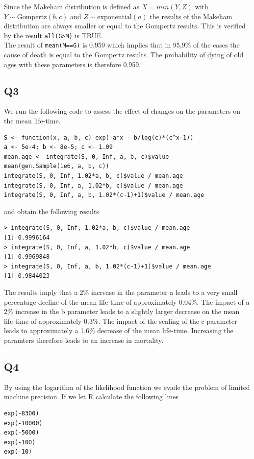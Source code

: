 \documentclass[11pt]{article}
\begin{document}
Since the Makeham distribution is defined as $X = min(Y,Z)$ with $Y \sim \text{Gompertz}(b,c)$ and $Z \sim \text{exponential}(a)$ the results of the Makeham distribution are always smaller or equal to the Gompertz results. This is verified by the result \verb+all(G>M)+ is TRUE. \\
The result of \verb+mean(M==G)+ is 0.959 which implies that in 95,9\% of the cases the cause of death is equal to the Gompertz results. The probability of dying of old ages with these parameters is therefore 0.959.

\subsection*{Q3}
We run the following code to assess the effect of changes on the parameters on the mean life-time.
\begin{verbatim}
S <- function(x, a, b, c) exp(-a*x - b/log(c)*(c^x-1))
a <- 5e-4; b <- 8e-5; c <- 1.09
mean.age <- integrate(S, 0, Inf, a, b, c)$value 
mean(gen.Sample(1e6, a, b, c))
integrate(S, 0, Inf, 1.02*a, b, c)$value / mean.age
integrate(S, 0, Inf, a, 1.02*b, c)$value / mean.age
integrate(S, 0, Inf, a, b, 1.02*(c-1)+1)$value / mean.age
\end{verbatim}
and obtain the following results
\begin{verbatim}
> integrate(S, 0, Inf, 1.02*a, b, c)$value / mean.age
[1] 0.9996164
> integrate(S, 0, Inf, a, 1.02*b, c)$value / mean.age
[1] 0.9969848
> integrate(S, 0, Inf, a, b, 1.02*(c-1)+1)$value / mean.age
[1] 0.9844023
\end{verbatim}
The results imply that a 2\% increase in the parameter a leads to a very small percentage decline of the mean life-time of approximately 0.04\%. The impact of a 2\% increase in the b parameter leads to a slightly larger decrease on the mean life-time of approximately 0.3\%. The impact of the scaling of the c parameter leads to approximately a 1.6\% decrease of the mean life-time. Increasing the paramters therefore leads to an increase in mortality.

\subsection*{Q4}

By using the logarithm of the likelihood function we evade the problem of limited machine precision. If we let R calculate the following lines

\begin{verbatim}
exp(-8300)
exp(-10000)
exp(-5000)
exp(-100)
exp(-10)
\end{verbatim}
\end{document}
